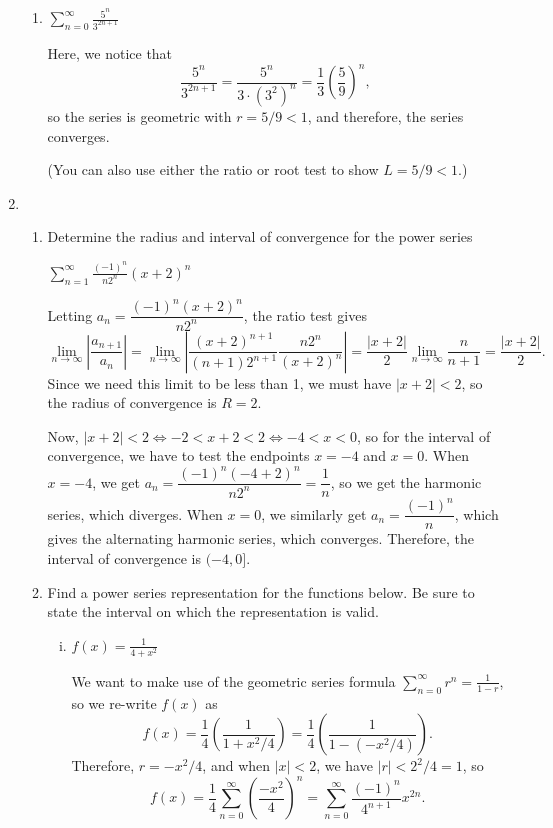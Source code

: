 \documentclass[12pt]{article}
\newcommand{\di}{\displaystyle}
\begin{document}
\begin{enumerate}
\begin{enumerate}
\item $\di \sum_{n=0}^\infty \frac{5^n}{3^{2n+1}}$\marginpar{[4]}

\bigskip

Here, we notice that
\[
\frac{5^n}{3^{2n+1}} = \frac{5^n}{3\cdot (3^2)^n} = \frac{1}{3}\left(\frac{5}{9}\right)^n,
\]
so the series is geometric with $r=5/9<1$, and therefore, the series converges.

(You can also use either the ratio or root test to show $L=5/9<1$.)
\end{enumerate}
\newpage
\item \begin{enumerate}
\item Determine the radius and interval of convergence for the power series
\marginpar{[4]}

$\di\sum_{n=1}^\infty \frac{(-1)^n}{n2^n}(x+2)^n$

\bigskip

Letting $a_n = \dfrac{(-1)^n(x+2)^n}{n2^n}$, the ratio test gives
\[
\lim_{n\to\infty}\left|\frac{a_{n+1}}{a_n}\right| = \lim_{n\to\infty}\left|\frac{(x+2)^{n+1}}{(n+1)2^{n+1}}\frac{n2^n}{(x+2)^n}\right| = \frac{|x+2|}{2}\lim_{n\to\infty}\frac{n}{n+1} = \frac{|x+2|}{2}.
\]
Since we need this limit to be less than 1, we must have $|x+2|<2$, so the radius of convergence is $R=2$.

Now, $|x+2|<2 \Leftrightarrow -2<x+2<2 \Leftrightarrow -4<x<0$, so for the interval of convergence, we have to test the endpoints $x=-4$ and $x=0$.  When $x=-4$, we get $a_n = \dfrac{(-1)^n(-4+2)^n}{n2^n} = \dfrac{1}{n}$, so we get the harmonic series, which diverges.  When $x=0$, we similarly get $a_n = \dfrac{(-1)^n}{n}$, which gives the alternating harmonic series, which converges.  Therefore, the interval of convergence is $(-4,0]$.

\bigskip


\item Find a power series representation for the functions below.  Be sure to state the interval on which the representation is valid.
\begin{enumerate}[(i)]
\item $\di f(x) = \frac{1}{4+x^2}$\marginpar{[3]}

We want to make use of the geometric series formula $\di \sum_{n=0}^\infty r^n = \frac{1}{1-r}$, so we re-write $f(x)$ as
\[
f(x) = \frac{1}{4}\left(\frac{1}{1+x^2/4}\right) = \frac{1}{4}\left(\frac{1}{1-(-x^2/4)}\right).
\]
Therefore, $r=-x^2/4$, and when $|x|<2$, we have $|r|<2^2/4=1$, so
\[
f(x) = \frac{1}{4}\sum_{n=0}^\infty \left(\frac{-x^2}{4}\right)^n = \sum_{n=0}^\infty \frac{(-1)^n}{4^{n+1}}x^{2n}.
\]
\vspace{1in}


\end{enumerate}
\end{enumerate}
\end{enumerate}
\end{document}
